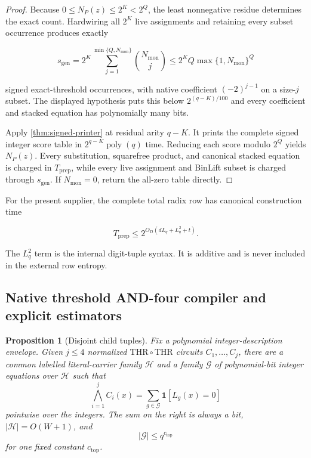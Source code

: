 \documentclass[11pt,letterpaper]{article}
\newcommand{\cref}[1]{\ref{#1}}
\newtheorem{proposition}[theorem]{Proposition}
\theoremstyle{definition}
\theoremstyle{remark}
\begin{document}
\begin{proof}
Because \(0\le N_P(z)\le2^K<2^Q\), the least nonnegative residue
determines the exact count. Hardwiring all \(2^K\) live assignments and
retaining every subset occurrence produces exactly

\[
s_{\mathrm{gen}}
{}={}
2^K
\sum_{j=1}^{\min\{Q,N_{\mathrm{mon}}\}}
\binom{N_{\mathrm{mon}}}j
\le
2^KQ\max\{1,N_{\mathrm{mon}}\}^{Q}
\]

signed exact-threshold occurrences, with native coefficient
\((-2)^{j-1}\) on a size-\(j\) subset. The displayed hypothesis puts
this below \(2^{(q-K)/100}\) and every coefficient and stacked equation
has polynomially many bits.

Apply \cref{thm:signed-printer} at residual arity \(q-K\). It prints the
complete signed integer score table in \(2^{q-K}\operatorname{poly}(q)\)
time. Reducing each score modulo \(2^Q\) yields \(N_P(z)\). Every
substitution, squarefree product, and canonical stacked equation is charged
in \(T_{\mathrm{prep}}\), while every live assignment and BinLift subset is
charged through \(s_{\mathrm{gen}}\). If \(N_{\mathrm{mon}}=0\), return the all-zero
table directly. \end{proof}

For the present supplier, the complete total radix row has canonical
construction time

\[
T_{\mathrm{prep}}
\le
2^{O_D(dL_q+L_q^2+t)}.
\]

The \(L_q^2\) term is the internal digit-tuple syntax. It is additive
and is never included in the external row entropy.

\subsection{Native threshold AND-four compiler and explicit
estimators}\label{a13-native-threshold-and-four-compiler-and-explicit-estimators}

\begin{proposition}[Disjoint child tuples]
\label{prop:child-tuples}
Fix a polynomial
integer-description envelope. Given \(j\le4\) normalized
\(\mathrm{THR}\circ\mathrm{THR}\) circuits \(C_1,\ldots,C_j\), there are
a common labelled literal-carrier family \(\mathcal H\) and a family
\(\mathcal G\) of polynomial-bit integer equations over \(\mathcal H\)
such that \[
\bigwedge_{i=1}^jC_i(x)
{}={}
\sum_{g\in\mathcal G}\mathbf1[L_g(x)=0]
\tag{A.13.1}
\] pointwise over the integers. The sum on the right is always a bit,
\(|\mathcal H|=O(W+1)\), and \[
|\mathcal G|\le q^{c_{\mathrm{top}}}
\] for one fixed constant \(c_{\mathrm{top}}\).
\end{proposition}
\end{document}
